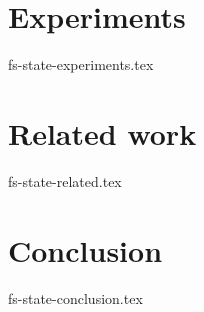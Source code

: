 \documentclass[conference]{IEEEtran}
\theoremstyle{definition}
\begin{document}
\section {Experiments}
 {fs-state-experiments.tex}

\section {Related work}
 {fs-state-related.tex}

\section {Conclusion}
 {fs-state-conclusion.tex}

\balance




\newpage
\end{document}
